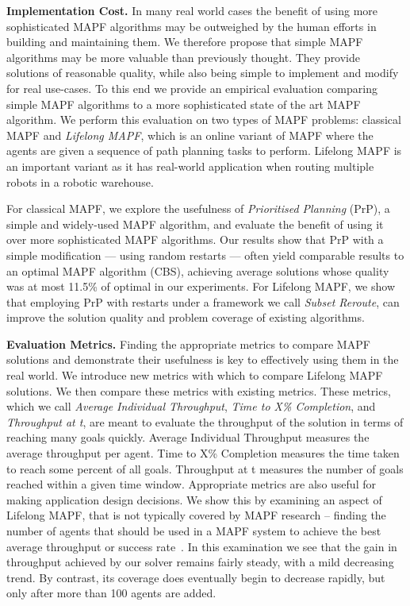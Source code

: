 \documentclass{article}
\newcommand{\sr}{Subset Reroute\xspace}
\newcommand{\lm}{Lifelong MAPF\xspace}
\newcommand{\indthr}{Average Individual Throughput\xspace}
\newcommand{\timeto}{Time to X\% Completion\xspace}
\newcommand{\thrat}{Throughput at t\xspace}
\begin{document}
\noindent \textbf{Implementation Cost.} 
In many real world cases the benefit of using more sophisticated MAPF algorithms may be outweighed by the human efforts in building and maintaining them. 
We therefore propose that simple MAPF algorithms may be more valuable than previously thought. They provide solutions of reasonable quality, while also being simple to implement and modify for real use-cases. 
To this end we provide an empirical evaluation comparing simple MAPF algorithms to a more sophisticated state of the art MAPF algorithm. We perform this evaluation on two types of MAPF problems: classical MAPF and \emph{\lm}, which is an online variant of MAPF where the agents are given a sequence of path planning tasks to perform. 
\lm is an important variant as it has real-world application when routing multiple robots in a robotic warehouse. 

For classical MAPF, we explore the usefulness of \emph{Prioritised Planning} \cite{latombe1991multiple} (PrP), a simple and widely-used MAPF algorithm, and evaluate the benefit of using it over more sophisticated MAPF algorithms. Our results show that PrP with a simple modification --- using random restarts --- often yield comparable results to an optimal MAPF algorithm (CBS), achieving average solutions whose quality was at most 11.5\% of optimal in our experiments. For \lm, we show that employing PrP with restarts under a framework we call \emph{\sr}, can improve the solution quality and problem coverage of existing algorithms. 

\noindent \textbf{Evaluation Metrics.} 
Finding the appropriate metrics to compare MAPF solutions and demonstrate their usefulness is key to effectively using them in the real world. We introduce new metrics with which to compare \lm solutions. We then compare these metrics with existing metrics. 
These metrics, which we call \emph{\indthr}, \emph{\timeto}, and \emph{\thrat}, are meant to evaluate the throughput of the solution in terms of reaching many goals quickly. \indthr measures the average throughput per agent. \timeto measures the time taken to reach some percent of all goals. \thrat measures the number of goals reached within a given time window.
Appropriate metrics are also useful for making application design decisions. We show this by examining an aspect of \lm, that is not typically covered by MAPF research -- finding the number of agents that should be used in a MAPF system to achieve the best average throughput or success rate~\cite{salzman2020research}. In this examination we see that the gain in throughput achieved by our solver remains fairly steady, with a mild decreasing trend. By contrast, its coverage does eventually begin to decrease rapidly, but only after more than 100 agents are added.
\end{document}
